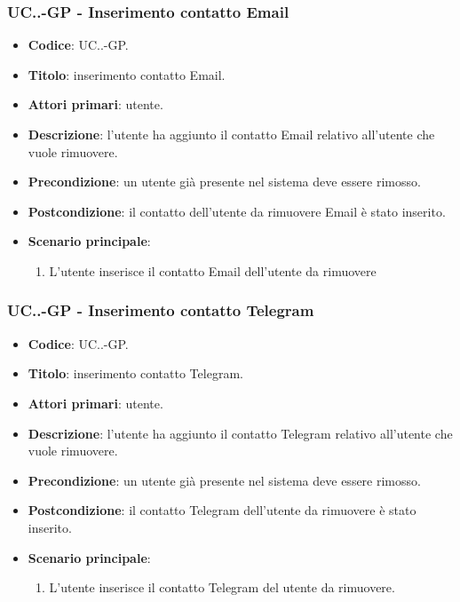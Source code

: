 			\subsubsection{UC\theuccount.\thesubuccount.\thesubsubuccount-GP - Inserimento contatto Email}
				
				\begin{itemize}
					\item \textbf{Codice}: UC\theuccount.\thesubuccount.\thesubsubuccount-GP.
					\item \textbf{Titolo}: inserimento contatto Email.
					\item \textbf{Attori primari}: utente.
					\item \textbf{Descrizione}: l'utente ha aggiunto il contatto Email relativo all'utente che vuole rimuovere.
					\item \textbf{Precondizione}: un utente già presente nel sistema deve essere rimosso.
					\item \textbf{Postcondizione}: il contatto dell'utente da rimuovere Email è stato inserito.
					\item \textbf{Scenario principale}:
					\begin{enumerate}
						\item L'utente inserisce il contatto Email dell'utente da rimuovere
					\end{enumerate}
				\end{itemize}
			
			\subsubsection{UC\theuccount.\thesubuccount.\thesubsubuccount-GP - Inserimento contatto Telegram}
				
				\begin{itemize}
					\item \textbf{Codice}: UC\theuccount.\thesubuccount.\thesubsubuccount-GP.
					\item \textbf{Titolo}: inserimento contatto Telegram.
					\item \textbf{Attori primari}: utente.
					\item \textbf{Descrizione}: l'utente ha aggiunto il contatto Telegram relativo all'utente che vuole \newline rimuovere.
					\item \textbf{Precondizione}: un utente già presente nel sistema deve essere rimosso.
					\item \textbf{Postcondizione}: il contatto Telegram dell'utente da rimuovere è stato inserito.
					\item \textbf{Scenario principale}:
					\begin{enumerate}
						\item L'utente inserisce il contatto Telegram del utente da rimuovere.
					\end{enumerate}
				\end{itemize}
			
